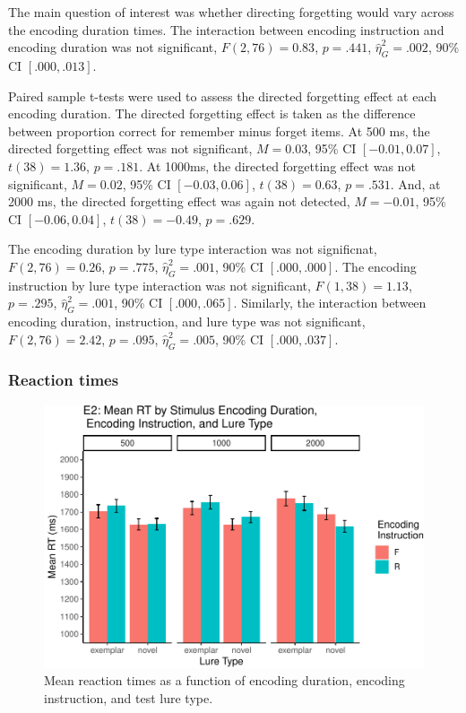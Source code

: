 \documentclass[
  man,floatsintext]{apa6}
\begin{document}
The main question of interest was whether directing forgetting would vary across the encoding duration times. The interaction between encoding instruction and encoding duration was not significant, \(F(2, 76) = 0.83\), \(p = .441\), \(\hat{\eta}^2_G = .002\), 90\% CI \([.000, .013]\).

Paired sample t-tests were used to assess the directed forgetting effect at each encoding duration. The directed forgetting effect is taken as the difference between proportion correct for remember minus forget items. At 500 ms, the directed forgetting effect was not significant, \(M = 0.03\), 95\% CI \([-0.01, 0.07]\), \(t(38) = 1.36\), \(p = .181\). At 1000ms, the directed forgetting effect was not significant, \(M = 0.02\), 95\% CI \([-0.03, 0.06]\), \(t(38) = 0.63\), \(p = .531\). And, at 2000 ms, the directed forgetting effect was again not detected, \(M = -0.01\), 95\% CI \([-0.06, 0.04]\), \(t(38) = -0.49\), \(p = .629\).

The encoding duration by lure type interaction was not significnat, \(F(2, 76) = 0.26\), \(p = .775\), \(\hat{\eta}^2_G = .001\), 90\% CI \([.000, .000]\). The encoding instruction by lure type interaction was not significant, \(F(1, 38) = 1.13\), \(p = .295\), \(\hat{\eta}^2_G = .001\), 90\% CI \([.000, .065]\). Similarly, the interaction between encoding duration, instruction, and lure type was not significant, \(F(2, 76) = 2.42\), \(p = .095\), \(\hat{\eta}^2_G = .005\), 90\% CI \([.000, .037]\).

\hypertarget{reaction-times-1}{%
\subsubsection{Reaction times}\label{reaction-times-1}}

\begin{figure}
\centering
\includegraphics{honorsThesis_NEW_files/figure-latex/E2fig2-1.pdf}
\caption{\label{fig:E2fig2}Mean reaction times as a function of encoding duration, encoding instruction, and test lure type.}
\end{figure}
\end{document}

